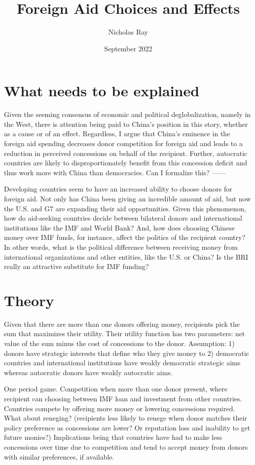 \documentclass{article}
\title{Foreign Aid Choices and Effects}
\author{Nicholas Ray}
\date{September 2022}
\begin{document}
\maketitle
\section*{What needs to be explained}
Given the seeming consensus of economic and political deglobalization,  namely in the West, there is attention being paid to China's position in this story, whether as a cause or of an effect. Regardless, I argue that China's eminence in the foreign aid spending decreases donor competition for foreign aid and leads to a reduction in perceived concessions on behalf of the recipient. Further, autocratic countries are likely to disproportionately benefit from this concession deficit and thus work more with China than democracies. Can I formalize this?
------

Developing countries seem to have an increased ability to choose donors for foreign aid. Not only has China been giving an incredible amount of aid, but now the U.S. and G7 are expanding their aid opportunities. Given this phenomenon, how do aid-seeking countries decide between bilateral donors and international institutions like the IMF and World Bank? And, how does choosing Chinese money over IMF funds, for instance, affect the politics of the recipient country? In other words, what is the political difference between receiving money from international organizations and other entities, like the U.S. or China? Is the BRI really an attractive substitute for IMF funding?

\section*{Theory} 
Given that there are more than one donors offering money, recipients pick the sum that maximizes their utility. Their utility function has two parameters: net value of the sum minus the cost of concessions to the donor. Assumption: 1) donors have strategic interests that define who they give money to 2) democratic countries and international institutions have weakly democratic strategic aims whereas autocratic donors have weakly autocratic aims. 

One period game. Competition when more than one donor present, where recipient can choosing between IMF loan and investment from other countries. Countries compete by offering more money or lowering concessions required. What about reneging? (recipients less likely to renege when donor matches their policy preference as concessions are lower? Or reputation loss and inability to get future monies?)  Implications being that countries have had to make less concessions over time due to competition and tend to accept money from donors with similar preferences, if available.
\end{document}
